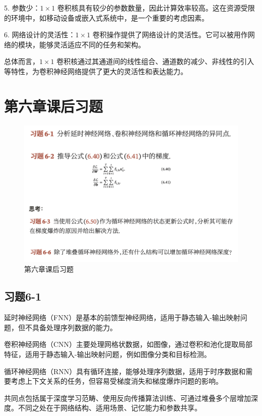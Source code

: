 \documentclass[]{article}
\begin{document}
5. 参数少：$1 \times 1$ 卷积核具有较少的参数数量，因此计算效率较高。这在资源受限的环境中，如移动设备或嵌入式系统中，是一个重要的考虑因素。

6. 网络设计的灵活性：$1 \times 1$ 卷积操作提供了网络设计的灵活性。它可以被用作网络的模块，能够灵活适应不同的任务和架构。

总体而言，$1 \times 1$ 卷积核通过其通道间的线性组合、通道数的减少、非线性的引入等特性，为卷积神经网络提供了更大的灵活性和表达能力。


\section{第六章课后习题}
\begin{figure}[H]
	\centering
	\includegraphics[width=1\linewidth]{第六章课后习题}
	\caption{第六章课后习题}
	\label{fig:}
\end{figure}

\subsection{习题6-1}
延时神经网络（FNN）是基本的前馈型神经网络，适用于静态输入-输出映射问题，但不具备处理序列数据的能力。

卷积神经网络（CNN）主要处理网格状数据，如图像，通过卷积和池化提取局部特征，适用于静态输入-输出映射问题，例如图像分类和目标检测。

循环神经网络（RNN）具有循环连接，能够处理序列数据，适用于时序数据和需要考虑上下文关系的任务，但容易受梯度消失和梯度爆炸问题的影响。

共同点包括属于深度学习范畴、使用反向传播算法训练、可通过堆叠多个层增加深度。不同之处在于网络结构、适用场景、记忆能力和参数共享。
\end{document}
